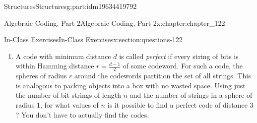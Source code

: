 \documentclass[oneside,10pt,]{book}
\numberwithin{equation}{section}
\begin{document}
\begin{partptx}{Structures}{}{Structures}{}{}{g:part:idm19634419792}
\begin{chapterptx}{Algebraic Coding, Part 2}{}{Algebraic Coding, Part 2}{}{}{x:chapter:chapter_122}
\begin{sectionptx}{In-Class Exercises}{}{In-Class Exercises}{}{}{x:section:questions-122}
\begin{enumerate}[label=\arabic*.]
\begin{equation*}
\begin{array}{cc|c}
1 & 1 & 0\\
0 & 1 & 1\\
\hline
1 & 0 &\\
\end{array}
\end{equation*}
and the code word is the string 11001110.%
\par
%
\begin{enumerate}[label=(\alph*)]
\item{}Suppose that you were sent four bit messages using this code and you received the following strings.  What were the messages, assuming no more than one error in the transmission of coded data?%
\begin{multicols}{3}
\begin{enumerate}[label=(\roman*)]
\item{}11011000%
\item{}01110010%
\item{}10001111%
\end{enumerate}
\end{multicols}
%
\item{}If you encoded \(n^2\) bits in this manner, what would be the rate of the code?%
\item{}Rectangular codes are linear codes.  For the 3 by 2 rectangular code, what are the generator and parity check matrices?%
\end{enumerate}
%
\item{}A code with minimum distance \(d\) is called \emph{perfect} if every string of bits is within Hamming distance \(r=\frac{d-1}{2}\) of some codeword. For such a code, the spheres of radius \(r\) around the codewords partition the set of all strings.  This is analogous to packing objects into a box with no wasted space.  Using just the number of bit strings of length \(n\) and the number of strings in a sphere of radius \(1\), for what values of \(n\) is it possible to find a perfect code of distance \(3\)?  You don't have to actually find the codes.%
%
\end{enumerate}
%
\end{sectionptx}
\end{chapterptx}
\end{partptx}
%
\backmatter
%
%
%
%
%
\typeout{************************************************}
\end{document}

